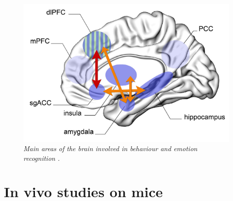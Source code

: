 \documentclass[12pt, a4paper]{report}
\begin{document}
	
	\begin{figure}[H]
		\begin{center}
			\includegraphics[scale=.75]{brain.png} 
		\end{center} 
		\caption{\textit{Main areas of the brain involved in behaviour and emotion recognition \cite{45}.}}
		
	\end{figure}

\newpage

\section{In vivo studies on mice}
\end{document}

